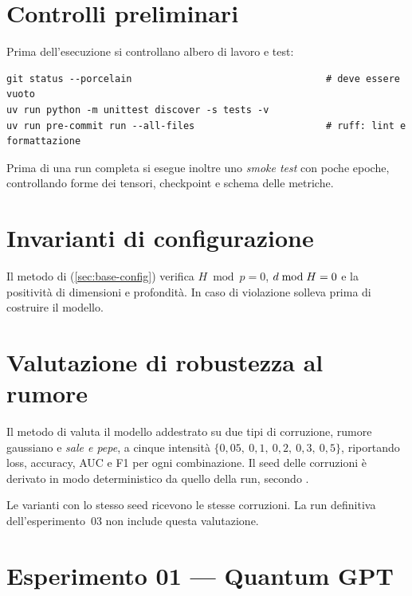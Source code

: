 \section{Controlli preliminari}

Prima dell'esecuzione si controllano albero di lavoro e test:

\begin{lstlisting}[style=shell, numbers=none]
git status --porcelain                                  # deve essere vuoto
uv run python -m unittest discover -s tests -v
uv run pre-commit run --all-files                       # ruff: lint e formattazione
\end{lstlisting}

Prima di una run completa si esegue inoltre uno \emph{smoke test} con poche
epoche, controllando forme dei tensori, checkpoint e schema delle metriche.

\section{Invarianti di configurazione}
\label{app:invarianti}

Il metodo  di 
(\cref{sec:base-config}) verifica $H \bmod p = 0$,
$d \bmod H = 0$ e la positività di dimensioni e profondità. In caso di
violazione solleva  prima di costruire il modello.

\section{Valutazione di robustezza al rumore}
\label{ssec:rumore}

Il metodo  di  valuta il
modello addestrato su due tipi di corruzione, rumore gaussiano e \emph{sale e
pepe}, a cinque intensità $\{0{,}05,\ 0{,}1,\ 0{,}2,\ 0{,}3,\ 0{,}5\}$, riportando
loss, accuracy, AUC e F1 per ogni combinazione. Il seed delle corruzioni è
derivato in modo deterministico da quello della run, secondo
.

Le varianti con lo stesso seed ricevono le stesse corruzioni. La run definitiva
dell'esperimento~03 non include questa valutazione.

\section{Esperimento 01 --- Quantum GPT}

